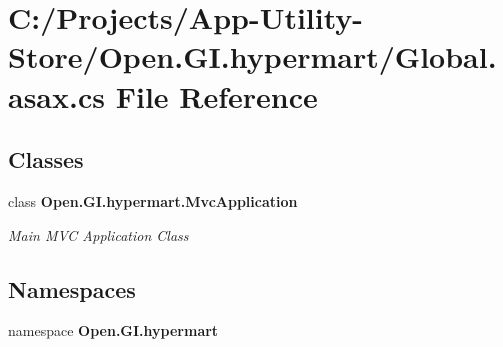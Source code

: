 \section{C\+:/\+Projects/\+App-\/\+Utility-\/\+Store/\+Open.G\+I.\+hypermart/\+Global.asax.\+cs File Reference}
\label{_global_8asax_8cs}
\subsection*{Classes}
\begin{DoxyCompactItemize}
\item 
class \textbf{ Open.\+G\+I.\+hypermart.\+Mvc\+Application}
\begin{DoxyCompactList}\small\item\em Main M\+VC Application Class \end{DoxyCompactList}\end{DoxyCompactItemize}
\subsection*{Namespaces}
\begin{DoxyCompactItemize}
\item 
namespace \textbf{ Open.\+G\+I.\+hypermart}
\end{DoxyCompactItemize}
